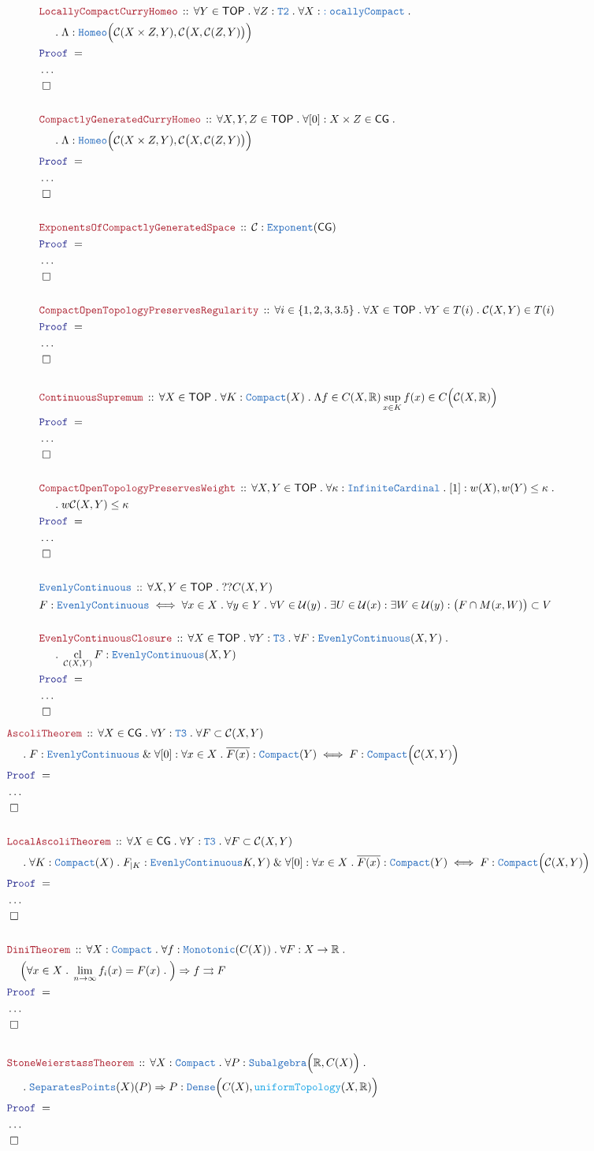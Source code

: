 \documentclass[12pt]{scrartcl}
\newcommand{\TYPE}[1]{\textcolor{NavyBlue}{\mathtt{#1}}}
\newcommand{\FUNC}[1]{\textcolor{Cerulean}{\mathtt{#1}}}
\newcommand{\LOGIC}[1]{\textcolor{Blue}{\mathtt{#1}}}
\newcommand{\THM}[1]{\textcolor{Maroon}{\mathtt{#1}}}
\renewcommand{\.}{\; . \;}
\newcommand{\Theorem}[2]{& \THM{#1} \, :: \, #2 \\ & \Proof = \\ }
\newcommand{\DeclareType}[2]{& \TYPE{#1} \, :: \, #2 \\}
\newcommand{\DefineType}[3]{& #1 : \TYPE{#2} \iff #3 \\}
\newcommand{\NewLine}{\\ & \kern 1pc}
\newcommand{\Page}[1]{ \begin{align*} #1 \end{align*}   }
\newcommand{\NoProof}{ & \ldots \\ \EndProof}
\renewcommand{\And}{\; \& \;}
\newcommand{\Imply}{\Rightarrow}
\newcommand{\Reals}{\mathbb{R} }
\newcommand{\QED}{\; \square}
\newcommand{\EndProof}{& \QED \\}
\newcommand{\Proof}{\LOGIC{Proof} \; }
\renewcommand{\C}{\mathcal{C}}
\DeclareMathOperator*{\cl}{cl}
\newcommand{\TOP}{\mathsf{TOP}}
\newcommand{\CG}{\mathsf{CG}}
\renewcommand{\U}{\mathcal{U}}
\begin{document}
\Page{
	\Theorem{LocallyCompactCurryHomeo}
	{
		\forall Y \in \TOP \.
		\forall Z : \TYPE{T2} \. 
		\forall X : \TYPE{:ocallyCompact} \.
		\NewLine \. 
		\Lambda : \TYPE{Homeo}\Big( \C(X \times Z, Y), \C\big(X,\C(Z,Y)\big) \Big)
	}
	\NoProof
	\\
	\Theorem{CompactlyGeneratedCurryHomeo}
	{
		\forall X,Y,Z \in \TOP \.
		\forall [0] : X \times Z \in \CG \. 
		\NewLine \. 
		\Lambda : \TYPE{Homeo}\Big( \C(X \times Z, Y), \C\big(X,\C(Z,Y)\big) \Big)
	}
	\NoProof
	\\
	\Theorem{ExponentsOfCompactlyGeneratedSpace}
	{
		\C : \TYPE{Exponent}(\CG)
	}
	\NoProof
	\\
	\Theorem{CompactOpenTopologyPreservesRegularity}
	{
		\forall i \in \{1,2,3,3.5 \} \. 
		\forall X \in \TOP \.
		\forall Y \in T(i) \.
		\C(X,Y) \in T(i)
	}
	\NoProof
	\\
	\Theorem{ContinuousSupremum}
	{
		\forall X \in \TOP \.
		\forall K : \TYPE{Compact}(X) \. 
		\Lambda f \in  C(X,\Reals)  \sup_{x \in K} f(x)  \in C\Big( \C(X,\Reals) \Big)
	}
	\NoProof
	\\
	\Theorem{CompactOpenTopologyPreservesWeight}
	{
		\forall X, Y \in \TOP \. 
		\forall \kappa : \TYPE{InfiniteCardinal} \.
		[1] : w(X),w(Y) \le \kappa \. \NewLine \. 
		w\C(X,Y) \le \kappa
	}
	\NoProof
	\\
	\DeclareType{EvenlyContinuous}
	{
		\forall X,Y \in \TOP \. ??C(X,Y) 
	}
	\DefineType{F}{\TYPE{EvenlyContinuous}}{
		\forall x \in X \. \forall y \in Y \.  \forall V \in \U(y) \.
		\exists U \in \U(x) : \exists W \in \U(y) : 
		\big(F \cap M(x,W)\big) \subset V
	}
	\\
	\Theorem{EvenlyContinuousClosure}
	{
		\forall X \in \TOP \.
		\forall Y : \TYPE{T3} \.
		\forall F : \TYPE{EvenlyContinuous}(X,Y) \. \NewLine \.
		\cl_{\C(X,Y)} F : \TYPE{EvenlyContinuous}(X,Y)
	}
	\NoProof
}
\Page{
	\Theorem{AscoliTheorem}
	{
		\forall X \in \CG \.
		\forall Y  : \TYPE{T3} \.
		\forall F \subset \C(X,Y)   \NewLine \.
		F : \TYPE{EvenlyContinuous}  \And  
		\forall [0] : \forall x \in X \. \overline{F(x)} : \TYPE{Compact}(Y) \iff
		F : \TYPE{Compact}\Big( \C(X,Y)\Big)
	}
	\NoProof
	\\
	\Theorem{LocalAscoliTheorem}
	{
		\forall X \in \CG \.
		\forall Y  : \TYPE{T3} \.
		\forall F \subset \C(X,Y)   \NewLine \.
		\forall K : \TYPE{Compact}(X) \. F_{|K} : \TYPE{EvenlyContinuous}K,Y )  \And  
		\forall [0] : \forall x \in X \. \overline{F(x)} : \TYPE{Compact}(Y) \iff
		F : \TYPE{Compact}\Big( \C(X,Y)\Big)
	}
	\NoProof
	\\
	\Theorem{DiniTheorem}
	{
		\forall X : \TYPE{Compact} \.
		\forall f : \TYPE{Monotonic}( C(X) ) \.
		\forall F : X \to \Reals \. \NewLine
		\Big(
			\forall x \in X \.
			\lim_{n \to \infty} f_i(x) = F(x) \.
		\Big) \Imply
		f \rightrightarrows F
	}
	\NoProof
	\\
	\Theorem{StoneWeierstassTheorem}
	{
		\forall X : \TYPE{Compact} \.
		\forall P : \TYPE{Subalgebra}\Big( \Reals, C(X) \Big) \. \NewLine \.
		\TYPE{SeparatesPoints}(X)(P) \Imply  P : \TYPE{Dense}\Big( C(X), \FUNC{uniformTopology}(X,\Reals) \Big)
	}
	\NoProof
}
\newpage
\end{document}
